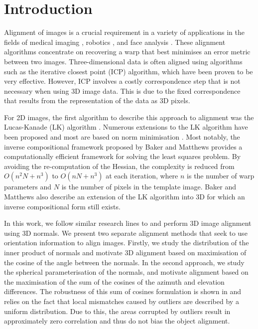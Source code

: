 \section{Introduction}\label{sec:introduction}
Alignment of images is a crucial requirement in a variety of applications in the fields of medical imaging \cite{RefWorks:69,RefWorks:70}, robotics \cite{RefWorks:11}, and face analysis \cite{RefWorks:6}. These alignment algorithms concentrate on recovering a warp that best minimises an error metric between two images. Three-dimensional data is often aligned using algorithms such as the iterative closest point (ICP) \cite{RefWorks:1} algorithm, which have been proven to be very effective. However, ICP involves a costly correspondence step that is not necessary when using 3D image data. This is due to the fixed correspondence that results from the representation of the data as 3D pixels. 

For 2D images, the first algorithm to describe this approach to alignment was the Lucas-Kanade (LK) algorithm \cite{RefWorks:71}. Numerous extensions to the LK algorithm have been proposed \cite{RefWorks:53,RefWorks:72,RefWorks:67} and most are based on \ltwo norm minimisation \cite{RefWorks:72,RefWorks:10,RefWorks:59,RefWorks:73}. Most notably, the inverse compositional framework proposed by Baker and Matthews \cite{RefWorks:74,RefWorks:10} provides a computationally efficient framework for solving the least squares problem. By avoiding the re-computation of the Hessian, the complexity is reduced from $O(n^2 N + n^3)$ to $O(n N + n^3)$ \cite{RefWorks:10} at each iteration, where $n$ is the number of warp parameters and $N$ is the number of pixels in the template image. Baker and Matthews also describe an extension of the LK algorithm into 3D \cite{RefWorks:75} for which an inverse compositional form still exists.

In this work, we follow similar research lines to \cite{RefWorks:6} and perform 3D image alignment using 3D normals. We present two separate alignment methods that seek to use orientation information to align images. Firstly, we study the distribution of the inner product of normals and motivate 3D alignment based on maximisation of the cosine of the angle between the normals. In the second approach, we study the spherical parameterisation of the normals, and motivate alignment based on the maximisation of the sum of the cosines of the azimuth and elevation differences. The robustness of this sum of cosines formulation is shown in \cite{RefWorks:68} and relies on the fact that local mismatches caused by outliers are described by a uniform distribution. Due to this, the areas corrupted by outliers result in approximately zero correlation and thus do not bias the object alignment.

